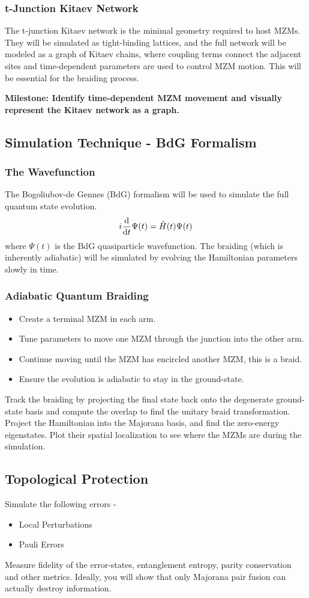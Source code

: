 \documentclass{article}
\newcommand{\0}{\mathbf{0}} %
\begin{document}
\subsubsection{t-Junction Kitaev Network}
The t-junction Kitaev network is the minimal geometry required to host MZMs. They will be simulated as tight-binding lattices, and the full network will be modeled as a graph of Kitaev chains, where coupling terms connect the adjacent sites and 
time-dependent parameters are used to control MZM motion. This will be essential for the braiding process.

\textbf{Milestone: Identify time-dependent MZM movement and visually represent the Kitaev network as a graph.}
\subsection{Simulation Technique - BdG Formalism}
\subsubsection{The Wavefunction}
The Bogoliubov-de Gennes (BdG) formalism will be used to simulate the full quantum state evolution. 
$$i\dv{t} \Psi(t) = \hat H(t) \Psi(t)$$ 
where $\Psi(t)$ is the BdG quasiparticle wavefunction. 
The braiding (which is inherently adiabatic) will be simulated by evolving the Hamiltonian parameters slowly in time. 
\subsubsection{Adiabatic Quantum Braiding}
\begin{itemize}
    \item Create a terminal MZM in each arm. 
    \item Tune parameters to move one MZM through the junction into the other arm.
    \item Continue moving until the MZM has encircled another MZM, this is a braid. 
    \item Ensure the evolution is adiabatic to stay in the ground-state.
\end{itemize}
Track the braiding by projecting the final state back onto the degenerate ground-state basis and compute the overlap to find the unitary braid transformation. Project the Hamiltonian into the Majorana basis, and find the zero-energy eigenstates. 
Plot their spatial localization to see where the MZMs are during the simulation.
\subsection{Topological Protection}
Simulate the following errors - 
\begin{itemize}
    \item Local Perturbations 
    \item Pauli Errors
\end{itemize}
Measure fidelity of the error-states, entanglement entropy, parity conservation and other metrics. Ideally, you will show that only Majorana pair fusion can actually destroy information.
\end{document}
